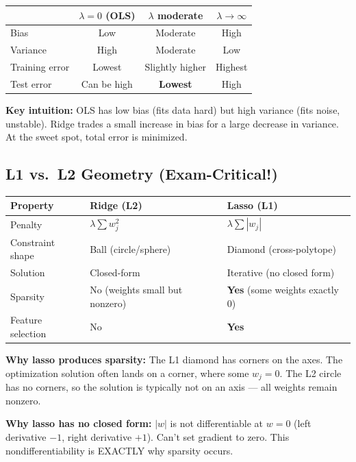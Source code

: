 \documentclass[11pt,a4paper]{article}
\begin{document}
\begin{center}
\begin{tabular}{|l|c|c|c|}
\hline
 & $\lambda=0$ (OLS) & $\lambda$ moderate & $\lambda \to \infty$ \\
\hline
Bias & Low & Moderate & High \\
Variance & High & Moderate & Low \\
Training error & Lowest & Slightly higher & Highest \\
Test error & Can be high & \textbf{Lowest} & High \\
\hline
\end{tabular}
\end{center}

\textbf{Key intuition:} OLS has low bias (fits data hard) but high variance (fits noise, unstable). Ridge trades a small increase in bias for a large decrease in variance. At the sweet spot, total error is minimized.

\subsection{L1 vs.\ L2 Geometry (Exam-Critical!)}

\begin{center}
\begin{tabular}{|l|l|l|}
\hline
\textbf{Property} & \textbf{Ridge (L2)} & \textbf{Lasso (L1)} \\
\hline
Penalty & $\lambda \sum w_j^2$ & $\lambda \sum |w_j|$ \\
Constraint shape & Ball (circle/sphere) & Diamond (cross-polytope) \\
Solution & Closed-form & Iterative (no closed form) \\
Sparsity & No (weights small but nonzero) & \textbf{Yes} (some weights exactly 0) \\
Feature selection & No & \textbf{Yes} \\
\hline
\end{tabular}
\end{center}

\textbf{Why lasso produces sparsity:} The L1 diamond has corners on the axes. The optimization solution often lands on a corner, where some $w_j = 0$. The L2 circle has no corners, so the solution is typically not on an axis --- all weights remain nonzero.

\textbf{Why lasso has no closed form:} $|w|$ is not differentiable at $w = 0$ (left derivative $-1$, right derivative $+1$). Can't set gradient to zero. This nondifferentiability is EXACTLY why sparsity occurs.
\end{document}
